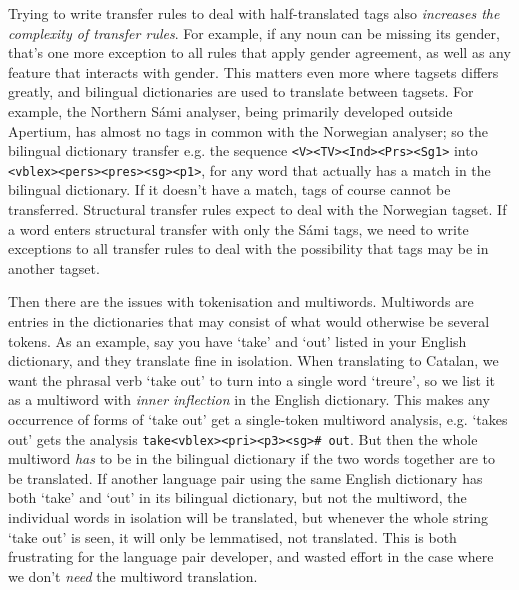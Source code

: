 \documentclass[10pt, a4paper]{article}
\newcommand{\ana}[1]{\texttt{#1}}
\newcommand{\f}[1]{`#1'}
\begin{document}
Trying to write transfer rules to deal with half-translated tags also
\emph{increases the complexity of transfer rules}. For example, if any
noun can be missing its gender, that's one more exception to all rules
that apply gender agreement, as well as any feature that interacts
with gender. This matters even more where tagsets differs greatly, and
bilingual dictionaries are used to translate between tagsets. For
example, the Northern Sámi analyser, being primarily developed outside
Apertium, has almost no tags in common with the Norwegian analyser; so
the bilingual dictionary transfer e.g. the sequence
\ana{<V><TV><Ind><Prs><Sg1>} into \ana{<vblex><pers><pres><sg><p1>},
for any word that actually has a match in the bilingual dictionary. If
it doesn't have a match, tags of course cannot be transferred.
Structural transfer rules expect to deal with the Norwegian tagset. If
a word enters structural transfer with only the Sámi tags, we need to
write exceptions to all transfer rules to deal with the possibility
that tags may be in another tagset.

Then there are the issues with tokenisation and multiwords. Multiwords
are entries in the dictionaries that may consist of what would
otherwise be several tokens. As an example, say you have \f{take} and
\f{out} listed in your English dictionary, and they translate fine in
isolation. When translating to Catalan, we want the phrasal verb
\f{take out} to turn into a single word \f{treure}, so we list it as a
multiword with \emph{inner inflection} in the English dictionary. This
makes any occurrence of forms of \f{take out} get a single-token
multiword analysis, e.g. \f{takes out} gets the analysis
\ana{take<vblex><pri><p3><sg>\# out}. But then the whole multiword
\emph{has} to be in the bilingual dictionary if the two words together
are to be translated. If another language pair using the same English
dictionary has both \f{take} and \f{out} in its bilingual dictionary,
but not the multiword, the individual words in isolation will be
translated, but whenever the whole string \f{take out} is seen, it
will only be lemmatised, not translated. This is both frustrating for
the language pair developer, and wasted effort in the case where we
don't \emph{need} the multiword translation.
\end{document}
